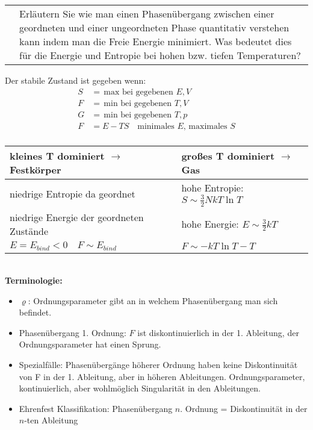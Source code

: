 \documentclass[a4paper,12pt]{scrartcl}
\makeatletter
\newcounter{qc}\setcounter{qc}{1}
\newenvironment{fshaded}{
\def\FrameCommand{\fcolorbox{framecolor}{shadecolor}}
\MakeFramed {\FrameRestore}}
{\endMakeFramed}
\def\frage#1{
\begin{fshaded}
\noindent
\begin{tabularx}{0.99\textwidth}{@{}c!{\color{framecolor}\vline}X}
{ \bf \rm \theqc }	&	\noindent #1
\end{tabularx}
\stepcounter{qc}
\end{fshaded}
}
\makeatother
\begin{document}
\frage{Erläutern Sie wie man einen Phasenübergang zwischen einer geordneten und einer ungeordneten Phase quantitativ verstehen 
kann indem man die Freie Energie minimiert. Was bedeutet dies für die Energie und Entropie
bei hohen bzw. tiefen Temperaturen?}
\noindent
	Der stabile Zustand ist gegeben wenn:
	\begin{align*}
		S&=\,\text{max bei gegebenen }E,V\\
		F&=\,\text{min bei gegebenen }T,V\\
		G&=\,\text{min bei gegebenen }T,p\\
		F&=E-TS\quad\text{minimales }E\text{, maximales }S\\	
	\end{align*}
	\begin{tabularx}{\textwidth}{@{}p{}|X}
		\textbf{kleines T dominiert $\rightarrow$ Festkörper} & \textbf{großes T dominiert $\rightarrow$ Gas}\\
		\hline{}
		niedrige Entropie da geordnet & hohe Entropie: $S\sim\frac{3}{2}NkT\ln T$\\
		niedrige Energie der geordneten Zustände & hohe Energie: $E\sim\frac{3}{2}kT$\\
		$E=E_{bind}<0\quad F\sim E_{bind}$&$F\sim-kT\ln T-T$\\
	\end{tabularx}	
	\\{\bf Terminologie:}
	\begin{itemize}
		\item{$\varrho$:} Ordnungsparameter gibt an in welchem Phasenübergang man sich befindet.
		\item{Phasenübergang 1. Ordnung:} $F$ ist diskontinuierlich in der 1. Ableitung, der Ordnungsparameter hat einen 
Sprung.
		\item{Spezialfälle:} Phasenübergänge höherer Ordnung haben keine Diskontinuität von F in der 1. Ableitung, aber in 
höheren Ableitungen. Ordnungsparameter, kontinuierlich, aber wohlmöglich Singularität in den Ableitungen.
		\item{Ehrenfest Klassifikation:} Phasenübergang $n$. Ordnung = Diskontinuität in der $n$-ten Ableitung
	\end{itemize}
\end{document}
